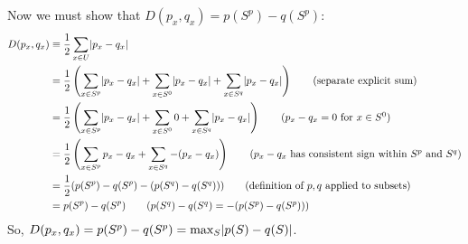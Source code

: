 Now we must show that $D(p_x,q_x) = p(S^p)-q(S^p)$:
\begin{align*}
D(p_x,q_x) &\equiv \frac{1}{2}\sum_{x\in U}\abs{p_x-q_x} \\
 &= \frac{1}{2}\left(\sum_{x\in S^p} \abs{p_x-q_x} + \sum_{x\in S^0} \abs{p_x-q_x} + \sum_{x\in S^q} \abs{p_x-q_x}\right) \tag{separate explicit sum} \\
 &= \frac{1}{2}\left(\sum_{x\in S^p} \abs{p_x-q_x} + \sum_{x\in S^0} 0 + \sum_{x\in S^q} \abs{p_x-q_x}\right) \tag{$p_x-q_x=0$ for $x\in S^0$} \\
 &= \frac{1}{2}\left(\sum_{x\in S^p} p_x-q_x + \sum_{x\in S^q} -(p_x-q_x)\right) \tag{$p_x-q_x$ has consistent sign within $S^p$ and $S^q$} \\
 &= \frac{1}{2}( p(S^p)-q(S^p) -(p(S^q)-q(S^q))) \tag{definition of $p,q$ applied to subsets} \\
 &= p(S^p)-q(S^p) \tag{$p(S^q)-q(S^q) = -(p(S^p)-q(S^p))$}
 \end{align*}
So, $D(p_x,q_x) = p(S^p)-q(S^p) = \max_{S}\abs{p(S)-q(S)}$.
